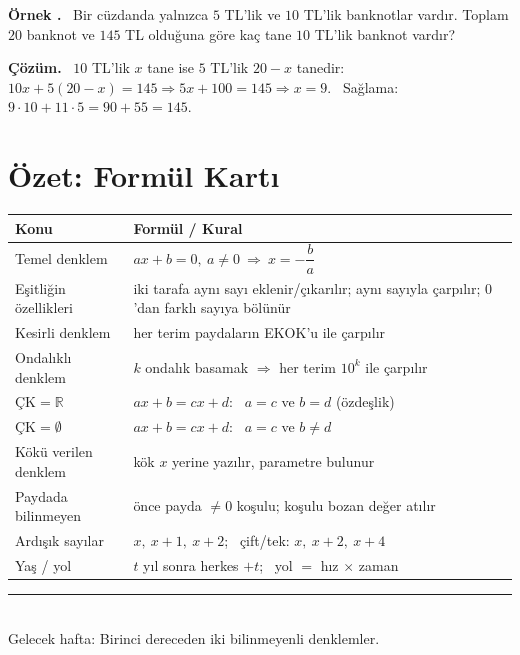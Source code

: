 \documentclass[11pt,a4paper]{article}
\newcounter{ornek}
\newenvironment{ornek}{\refstepcounter{ornek}\par\medskip\noindent\textbf{\color{anamavi}Örnek \theornek.}\ }{\par}
\newenvironment{cozum}{\begin{tcolorbox}[colback=cozumyesil!6,colframe=cozumyesil,boxrule=0.5pt,left=4pt,right=4pt,top=2pt,bottom=2pt,breakable]\textbf{\color{cozumyesil}Çözüm.}\ }{\end{tcolorbox}}
\newcounter{alis}
\begin{document}
\begin{ornek}
Bir cüzdanda yalnızca \(5\) TL'lik ve \(10\) TL'lik banknotlar vardır. Toplam \(20\) banknot ve \(145\) TL olduğuna göre kaç tane \(10\) TL'lik banknot vardır?
\end{ornek}
\begin{cozum}
\(10\) TL'lik \(x\) tane ise \(5\) TL'lik \(20-x\) tanedir: \quad \(10x+5(20-x)=145\Rightarrow 5x+100=145\Rightarrow x=9\). \ Sağlama: \(9\cdot 10+11\cdot 5=90+55=145\).
\end{cozum}

\section{Özet: Formül Kartı}
\begin{center}
\small
\renewcommand{\arraystretch}{1.18}
\begin{tabular}{@{}lp{}@{}}
\toprule
Konu & Formül / Kural\\\midrule
Temel denklem & \(ax+b=0,\ a\neq 0\ \Rightarrow\ x=-\dfrac{b}{a}\)\\
Eşitliğin özellikleri & iki tarafa aynı sayı eklenir/çıkarılır; aynı sayıyla çarpılır; \(0\)'dan farklı sayıya bölünür\\
Kesirli denklem & her terim paydaların EKOK'u ile çarpılır\\
Ondalıklı denklem & \(k\) ondalık basamak \(\Rightarrow\) her terim \(10^{k}\) ile çarpılır\\
\(\text{ÇK}=\mathbb{R}\) & \(ax+b=cx+d\): \ \(a=c\) ve \(b=d\) (özdeşlik)\\
\(\text{ÇK}=\emptyset\) & \(ax+b=cx+d\): \ \(a=c\) ve \(b\neq d\)\\
Kökü verilen denklem & kök \(x\) yerine yazılır, parametre bulunur\\
Paydada bilinmeyen & önce payda \(\neq 0\) koşulu; koşulu bozan değer atılır\\
Ardışık sayılar & \(x,\ x+1,\ x+2\); \ çift/tek: \(x,\ x+2,\ x+4\)\\
Yaş / yol & \(t\) yıl sonra herkes \(+t\); \ yol \(=\) hız \(\times\) zaman\\\bottomrule
\end{tabular}
\end{center}

\newpage


\vspace{6pt}
\noindent\textcolor{anamavi}{\rule{\textwidth}{0.5pt}}\\
{\small Gelecek hafta: Birinci dereceden iki bilinmeyenli denklemler.}
\end{document}
